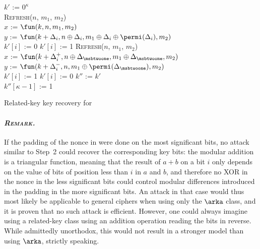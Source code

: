 \begin{algorithm}[h]
\LinesNumbered
{}

$k'$ := $0^\kappa$\\
{
	\textsc{Refresh}($n$, $m_1$, $m_2$)\\
	$x$ := $\fun(k, n, m_1, m_2)$\\
	$y$ := $\fun(k + \Delta_i, n \oplus \Delta_i,
                 m_1 \oplus \Delta_i \oplus \permi(\Delta_i), m_2)$\\
	{
		$k'[i]$ := 0	
	}
	\Else
	{
		$k'[i]$ := 1
	}
}
{
	\textsc{Refresh}($n$, $m_1$, $m_2$)\\
	$x$ := $\fun(k + \Delta_i^+, n \oplus \Delta_{\msbtwoone}, m_1 \oplus \Delta_{\msbtwoone}, m_2)$\\
	$y$ := $\fun(k + \Delta_i^-, n, m_1 \oplus \permi(\Delta_{\msbtwoone}), m_2)$\\
	{
		$k'[i]$ := 1	
	}
	\Else
	{
		$k'[i]$ := 0
	}
}
$k''$ := $k'$\\
$k''[\kappa - 1]$ := 1\\
\caption{Related-key key recovery for \proestotr\label{alg:kr}}
\end{algorithm}


\paragraph{\emph{\textsc{Remark.}}} If the padding of the nonce in \proestotr were done on the most significant bits, no attack similar
to Step~2 could recover
the corresponding key bits: the modular addition is a triangular function, meaning that the result of $a + b$ on a bit $i$ only
depends on the value of bits of position less than $i$ in $a$ and $b$, and therefore no XOR in the nonce in the less
significant bits could control modular differences introduced in the padding in the more significant bits. An attack in that case would thus most likely
be applicable to general ciphers when using only the $\arka$ class, and it is proven that no such attack is efficient.
However, one could always imagine using a related-key class using an addition operation reading the bits in reverse. While
admittedly unorthodox, this would not result in a stronger model than using $\arka$, strictly speaking.

